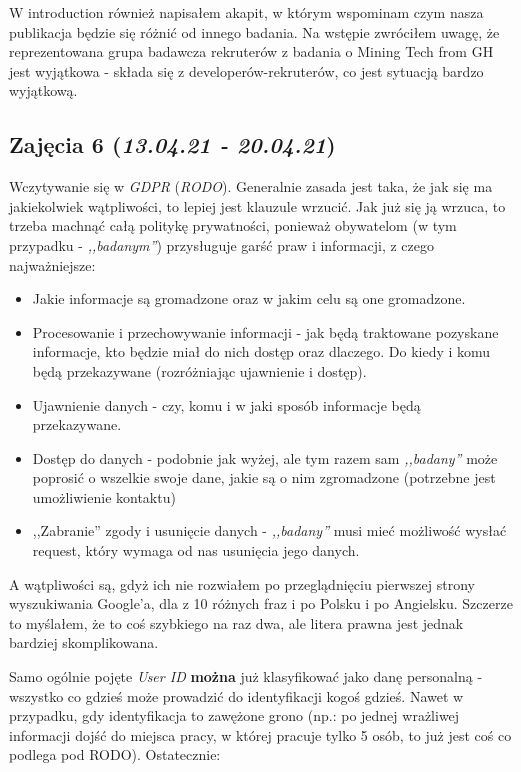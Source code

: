 \documentclass[graybox]{svmult}
\begin{document}
W introduction również napisałem akapit, w którym wspominam czym nasza publikacja będzie się różnić od innego badania. Na wstępie zwróciłem uwagę, że reprezentowana grupa badawcza rekruterów z badania o Mining Tech from GH jest wyjątkowa - składa się z developerów-rekruterów, co jest sytuacją bardzo wyjątkową.

\subsection{Zajęcia 6 (\emph{13.04.21 - 20.04.21})}
Wczytywanie się w \emph{GDPR} (\emph{RODO}). Generalnie zasada jest taka, że jak się ma jakiekolwiek wątpliwości, to lepiej jest klauzule wrzucić. Jak już się ją wrzuca, to trzeba machnąć całą politykę prywatności, ponieważ obywatelom (w tym przypadku - \emph{,,badanym''}) przysługuje garść praw i informacji, z czego najważniejsze:

\begin{itemize}
  \item Jakie informacje są gromadzone oraz w jakim celu są one gromadzone.
  \item Procesowanie i przechowywanie informacji - jak będą traktowane pozyskane informacje, kto będzie miał do nich dostęp oraz dlaczego. Do kiedy i komu będą przekazywane (rozróżniając ujawnienie i dostęp).
  \item Ujawnienie danych - czy, komu i w jaki sposób informacje będą przekazywane. 
  \item Dostęp do danych - podobnie jak wyżej, ale tym razem sam \emph{,,badany''} może poprosić o wszelkie swoje dane, jakie są o nim zgromadzone (potrzebne jest umożliwienie kontaktu)
  \item ,,Zabranie'' zgody i usunięcie danych - \emph{,,badany''} musi mieć możliwość wysłać request, który wymaga od nas usunięcia jego danych.
\end{itemize}

A wątpliwości są, gdyż ich nie rozwiałem po przeglądnięciu pierwszej strony wyszukiwania Google'a, dla z 10 różnych fraz i po Polsku i po Angielsku. Szczerze to myślałem, że to coś szybkiego na raz dwa, ale litera prawna jest jednak bardziej skomplikowana. 

Samo ogólnie pojęte \emph{User ID} \textbf{można} już klasyfikować jako danę personalną - wszystko co gdzieś może prowadzić do identyfikacji kogoś gdzieś. Nawet w przypadku, gdy identyfikacja to zawężone grono (np.: po jednej wrażliwej informacji dojść do miejsca pracy, w której pracuje tylko 5 osób, to już jest coś co podlega pod RODO). Ostatecznie:
\end{document}
